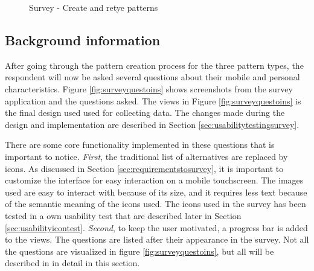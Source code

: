 \begin{figure}[H]
{        \label{fig:retypewrong}
      }
      \caption{Survey - Create and retye patterns}
      \label{fig:createandretypepatterns}
    \end{figure}

  \clearpage 

  \subsection{Background information}
    After going through the pattern creation process for the three pattern types, the respondent will now be asked several questions about their mobile and personal characteristics. Figure \ref{fig:surveyquestoins} shows screenshots from the survey application and the questions asked. The views in Figure \ref{fig:surveyquestoins} is the final design used used for collecting data. The changes made during the design and implementation are described in Section \ref{sec:usabilitytestingsurvey}. 

    There are some core functionality implemented in these questions that is important to notice. {\it First}, the traditional list of alternatives are replaced by icons. As discussed in Section \ref{sec:requirementstosurvey}, it is important to customize the interface for easy interaction on a mobile touchscreen. The images used are easy to interact with because of its size, and it requires less text because of the semantic meaning of the icons used. The icons used in the survey has been tested in a own usability test that are described later in Section \ref{sec:usabilityicontest}. {\it Second}, to keep the user motivated, a progress bar is added to the views. The questions are listed after their appearance in the survey. Not all the questions are visualized in figure \ref{fig:surveyquestoins}, but all will be described in in detail in this section. 

